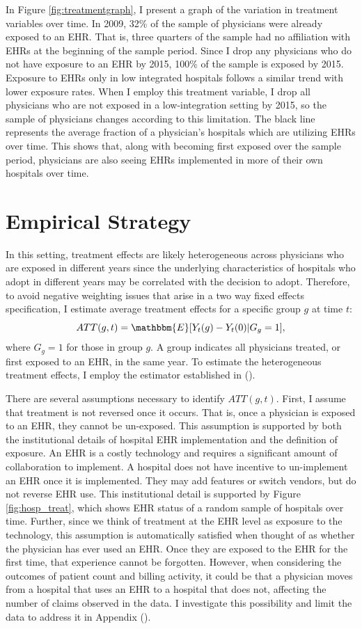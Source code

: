 \documentclass[11pt]{article}
\begin{document}
In Figure \ref{fig:treatmentgraph}, I present a graph of the variation in treatment variables over time. In 2009, 32\% of the sample of physicians were already exposed to an EHR. That is, three quarters of the sample had no affiliation with EHRs at the beginning of the sample period. Since I drop any physicians who do not have exposure to an EHR by 2015, 100\% of the sample is exposed by 2015. Exposure to EHRs only in low integrated hospitals follows a similar trend with lower exposure rates. When I employ this treatment variable, I drop all physicians who are not exposed in a low-integration setting by 2015, so the sample of physicians changes according to this limitation. The black line represents the average fraction of a physician's hospitals which are utilizing EHRs over time. This shows that, along with becoming first exposed over the sample period, physicians are also seeing EHRs implemented in more of their own hospitals over time.


\section{Empirical Strategy}

In this setting, treatment effects are likely heterogeneous across physicians who are exposed in different years since the underlying characteristics of hospitals who adopt in different years may be correlated with the decision to adopt. Therefore, to avoid negative weighting issues that arise in a two way fixed effects specification, I estimate average treatment effects for a specific group $g$ at time $t$: 
$$ATT(g,t)=\mathbbm{E}[Y_t(g)-Y_t(0)|G_g=1],$$
where $G_g=1$ for those in group $g$. A group indicates all physicians treated, or first exposed to an EHR, in the same year. To estimate the heterogeneous treatment effects, I employ the estimator established in \citeauthor{callaway2021difference} (\citeyear{callaway2021difference}).

There are several assumptions necessary to identify $ATT(g,t)$. First, I assume that treatment is not reversed once it occurs. That is, once a physician is exposed to an EHR, they cannot be un-exposed. This assumption is supported by both the institutional details of hospital EHR implementation and the definition of exposure. An EHR is a costly technology and requires a significant amount of collaboration to implement. A hospital does not have incentive to un-implement an EHR once it is implemented. They may add features or switch vendors, but do not reverse EHR use. This institutional detail is supported by Figure \ref{fig:hosp_treat}, which shows EHR status of a random sample of hospitals over time. Further, since we think of treatment at the EHR level as exposure to the technology, this assumption is automatically satisfied when thought of as whether the physician has ever used an EHR. Once they are exposed to the EHR for the first time, that experience cannot be forgotten. However, when considering the outcomes of patient count and billing activity, it could be that a physician moves from a hospital that uses an EHR to a hospital that does not, affecting the number of claims observed in the data. I investigate this possibility and limit the data to address it in Appendix (). 
\end{document}
